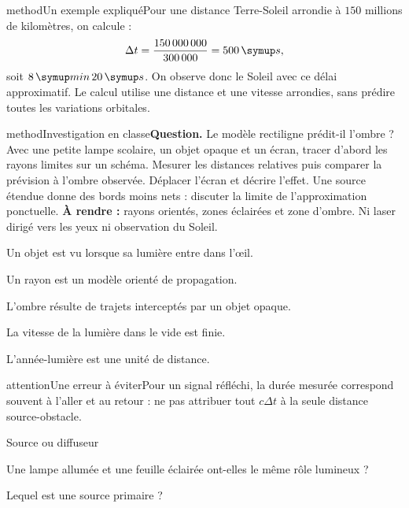\begin{pcEncadre}{method}{Un exemple expliqué}Pour une distance Terre-Soleil arrondie à $150$ millions de kilomètres, on calcule : \[\Delta t=\dfrac{150\,000\,000}{300\,000}=500\unite s,\] soit $8\unite{min}\,20\unite s$. On observe donc le Soleil avec ce délai approximatif. Le calcul utilise une distance et une vitesse arrondies, sans prédire toutes les variations orbitales.\end{pcEncadre}
\label{activite-18}
\begin{pcEncadre}{method}{Investigation en classe}\textbf{Question.} Le modèle rectiligne prédit-il l’ombre ? Avec une petite lampe scolaire, un objet opaque et un écran, tracer d’abord les rayons limites sur un schéma. Mesurer les distances relatives puis comparer la prévision à l’ombre observée. Déplacer l’écran et décrire l’effet. Une source étendue donne des bords moins nets : discuter la limite de l’approximation ponctuelle. \textbf{À rendre :} rayons orientés, zones éclairées et zone d’ombre. Ni laser dirigé vers les yeux ni observation du Soleil.\end{pcEncadre}
\begin{questions}
\item Un objet est vu lorsque sa lumière entre dans l’œil.
\item Un rayon est un modèle orienté de propagation.
\item L’ombre résulte de trajets interceptés par un objet opaque.
\item La vitesse de la lumière dans le vide est finie.
\item L’année-lumière est une unité de distance.
\end{questions}
\begin{pcEncadre}{attention}{Une erreur à éviter}Pour un signal réfléchi, la durée mesurée correspond souvent à l’aller et au retour : ne pas attribuer tout $c\Delta t$ à la seule distance source-obstacle.\end{pcEncadre}
\pcGrille
\clearpage{}
\par\noindent\begin{minipage}{\linewidth}
\begin{exercice}[1]{Source ou diffuseur}
\begin{questions}
\item Une lampe allumée et une feuille éclairée ont-elles le même rôle lumineux ?
\item Lequel est une source primaire ?
\end{questions}
\end{exercice}
\end{minipage}
